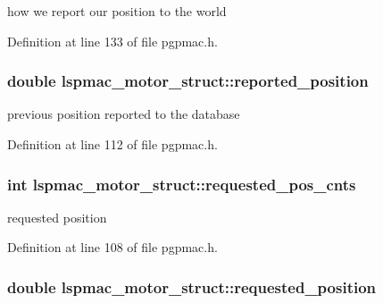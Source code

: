 how we report our position to the world 



Definition at line 133 of file pgpmac.\-h.

\hypertarget{structlspmac__motor__struct_ae5f1f605a0f587500e627332ad4e5e7e}{
\subsubsection[{reported\-\_\-position}]{\setlength{\rightskip}{0pt plus 5cm}double lspmac\-\_\-motor\-\_\-struct\-::reported\-\_\-position}}\label{structlspmac__motor__struct_ae5f1f605a0f587500e627332ad4e5e7e}


previous position reported to the database 



Definition at line 112 of file pgpmac.\-h.

\hypertarget{structlspmac__motor__struct_a6e8dc9c11dc52a439fe9837230f93ce2}{
\subsubsection[{requested\-\_\-pos\-\_\-cnts}]{\setlength{\rightskip}{0pt plus 5cm}int lspmac\-\_\-motor\-\_\-struct\-::requested\-\_\-pos\-\_\-cnts}}\label{structlspmac__motor__struct_a6e8dc9c11dc52a439fe9837230f93ce2}


requested position 



Definition at line 108 of file pgpmac.\-h.

\hypertarget{structlspmac__motor__struct_af8cdc94c6e2478b12ce942d4cf1d7499}{
\subsubsection[{requested\-\_\-position}]{\setlength{\rightskip}{0pt plus 5cm}double lspmac\-\_\-motor\-\_\-struct\-::requested\-\_\-position}}\label{structlspmac__motor__struct_af8cdc94c6e2478b12ce942d4cf1d7499}


